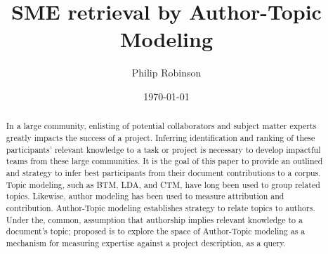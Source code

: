 \documentclass{article}
\title{SME retrieval by Author-Topic Modeling}
\date{\today}
\author{Philip Robinson}
\affil{NASA: Jet Propoultion Labratory}
\begin{document}
\maketitle

\begin{abstract}
  In a large community, enlisting of potential collaborators and subject matter experts
  greatly impacts the success of a project. Inferring identification and ranking of
  these participants' relevant knowledge to a task or project is necessary to develop
  impactful teams from these large communities\cite{Minto2007}. It is the goal of this
  paper to provide an outlined and strategy to infer best participants from their
  document contributions to a corpus. Topic modeling, such as BTM\cite{Yan2013}, LDA,
  and CTM, have long been used to group related topics\cite{Alghamdi2015}. Likewise,
  author modeling has been used to measure attribution\cite{Rexha2018} and
  contribution\cite{AldebeiHJ016}. Author-Topic modeling establishes strategy to
  relate topics to authors\cite{Rosen-Zvi2004}. Under the, common, assumption that
  authorship implies relevant knowledge to a document's topic; proposed is to explore
  the space of Author-Topic modeling as a mechanism for measuring expertise against a
  project description, as a query.
\end{abstract}

\end{document}
